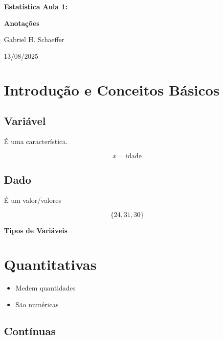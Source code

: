 \documentclass{article}
\begin{document}
\begin{titlepage}
    \centering
    \vspace*{\fill}
    {\huge \textbf{Estatística Aula 1:}\par} 
    {\Large \textbf{Anotações}\par} 
    \vspace{0.7cm} 
    {\Large Gabriel H. Schaeffer\par} 
    \vspace{0.5cm} 
    {\large 13/08/2025\par} 
    \vspace*{\fill}
\end{titlepage}

\newpage

\setcounter{section}{-1}
\section{Introdução e Conceitos Básicos}
\vspace{0.5cm}
\subsection{Variável}
É uma característica.

{
\Large
$$
x = \text{idade}
$$
}

\subsection{Dado}
É um valor/valores

{
\Large
$$ 
\lbrace 24, 31, 30 \rbrace
$$
}

\vspace{1cm}
{\noindent \huge \textbf{Tipos de Variáveis}\par}
\vspace{0.5cm}

\section{Quantitativas}
\begin{itemize}
    \item Medem quantidades
    \item São numéricas
\end{itemize}

\vspace{0.2cm}
\subsection{Contínuas}
\end{document}
